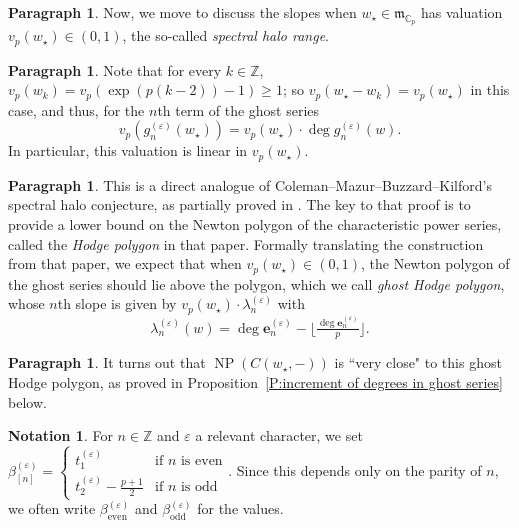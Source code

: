 \documentclass[12pt]{amsart}
\theoremstyle{definition}
\newtheorem{notation}[subsection]{Notation}
\newtheorem{para}[subsection]{Paragraph}
\numberwithin{equation}{subsection}
\def\gothm{\mathfrak{m}}
\def\CC{\mathbb{C}}
\def\ZZ{\mathbb{Z}}
\def\bfe{\mathbf{e}}
\DeclareMathOperator{\NP}{NP}
\newcommand{\even}{\mathrm{even}}
\newcommand{\odd}{\mathrm{odd}}
\begin{document}
\begin{para}
\label{P:para_128}
Now, we move to discuss the slopes when $w_\star \in \gothm_{\CC_p}$ has valuation $v_p(w_\star) \in (0,1)$, the so-called \emph{spectral halo range}.
\end{para}

\begin{para}
\label{P:para_129}
Note that for every $k \in \ZZ$, $v_p(w_k) = v_p(\exp(p(k-2))-1) \geq 1$; so $v_p(w_\star- w_k) = v_p(w_\star)$ in this case, and thus, for the $n$th term of the ghost series
$$
v_p(g_n^{(\varepsilon)}(w_\star)) =  v_p(w_\star) \cdot \deg g_n^{(\varepsilon)}(w).
$$
In particular, this valuation is linear in $v_p(w_\star)$. 
\end{para}

\begin{para}
\label{P:para_130}
This is a direct analogue of Coleman--Mazur--Buzzard--Kilford's spectral halo conjecture, as partially proved in \cite{liu-wan-xiao}. The key to that proof is to provide a lower bound on the Newton polygon of the  characteristic power series, called the \emph{Hodge polygon} in that paper.
Formally translating the construction from that paper, we expect that when $v_p(w_\star) \in (0,1)$, the Newton polygon of the ghost series should lie above the polygon, which we call \emph{ghost Hodge polygon}, whose $n$th slope is given by $v_p(w_\star) \cdot \lambda_n^{(\varepsilon)}$ with  $$\lambda_n^{(\varepsilon)}(w)= \deg \bfe_n^{(\varepsilon)} - \big\lfloor \tfrac{\deg \bfe_n^{(\varepsilon)}}p\big\rfloor.$$
\end{para}

\begin{para}
\label{P:para_131}
It turns out that $\NP(C(w_\star, -))$ is ``very close" to this ghost Hodge polygon, as proved in Proposition~\ref{P:increment of degrees in ghost series} below.
\end{para}

\begin{notation}
\label{N:tnvarepsilon}
For $n \in \ZZ$ and $\varepsilon$ a relevant character, we set
$\beta_{[n]}^{(\varepsilon)} = \begin{cases}
t_1^{(\varepsilon)} & \textrm{if }n \textrm{ is even}
\\
t_2^{(\varepsilon)}-
\tfrac{p+1}2 & \textrm{if }n \textrm{ is odd}
\end{cases}$.
Since this depends only on the parity of $n$, we often write $\beta_\even^{(\varepsilon)}$ and $\beta_\odd^{(\varepsilon)}$ for the values.
\end{notation}
\end{document}
